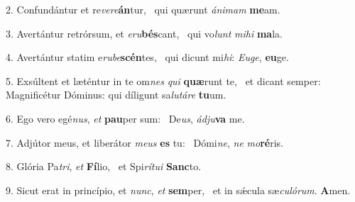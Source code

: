 2. Confundántur et re\textit{ve}\textit{re}\textbf{án}tur, \ast\  qui quærunt \textit{á}\textit{ni}\textit{mam} \textbf{me}am.\

3. Avertántur retrórsum, et \textit{e}\textit{ru}\textbf{bés}cant, \ast\  qui vo\textit{lunt} \textit{mi}\textit{hi} \textbf{ma}la.\

4. Avertántur statim e\textit{ru}\textit{be}\textbf{scén}tes, \ast\  qui dicunt mi\textit{hi}: \textit{Eu}\textit{ge}, \textbf{eu}ge.\

5. Exsúltent et læténtur in te om\textit{nes} \textit{qui} \textbf{quæ}runt te, \ast\  et dicant semper: Magnificétur Dóminus: qui díligunt sa\textit{lu}\textit{tá}\textit{re} \textbf{tu}um.\

6. Ego vero egé\textit{nus}, \textit{et} \textbf{pau}per sum: \ast\  De\textit{us}, \textit{ád}\textit{ju}\textbf{va} me.\

7. Adjútor meus, et liberátor \textit{me}\textit{us} \textbf{es} tu: \ast\  Dómi\textit{ne}, \textit{ne} \textit{mo}\textbf{ré}ris.\

8. Glória Pa\textit{tri}, \textit{et} \textbf{Fí}lio, \ast\  et Spi\textit{rí}\textit{tu}\textit{i} \textbf{Sanc}to.\

9. Sicut erat in princípio, et \textit{nunc}, \textit{et} \textbf{sem}per, \ast\  et in sǽcula sæ\textit{cu}\textit{ló}\textit{rum}. \textbf{A}men.\

